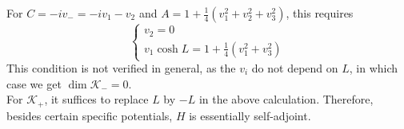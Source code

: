 For $C = -iv_- = -iv_1 - v_2$ and $A = 1 + \frac{1}{4}(v_1^2 + v_2^2 + v_3^2)$, this requires
\begin{equation}
\begin{cases}
v_2 = 0 \\
v_1 \cosh L = 1 + \frac{1}{4}(v_1^2 + v_3^2)
\end{cases}
\end{equation}
This condition is not verified in general, as the $v_i$ do not depend on $L$, in which case we get $\dim \mathcal{K}_- = 0$. \\
For $\mathcal{K}_+$, it suffices to replace $L$ by $-L$ in the above calculation. Therefore, besides certain specific potentials, $H$ is essentially self-adjoint.

















